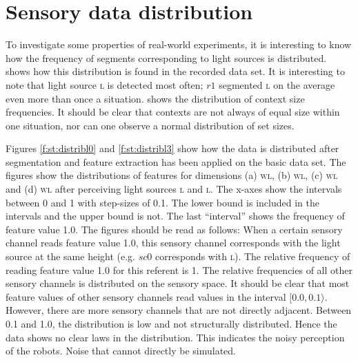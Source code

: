\chapter{Sensory data distribution}\label{a:dataset}

To investigate some properties of real-world experiments, it is interesting to know how the frequency of segments corresponding to light sources is distribut\-ed.  shows how this distribution is found in the recorded data set. It is interesting to note that light source \textsc{l} is detected most often; $r1$ segmented \textsc{l} on the average even more than once a situation.  shows the distribution of context size frequencies. It should be clear that contexts are not always of equal size within one situation, nor can one observe a normal distribution of set sizes.

Figures \ref{f:st:distribl0} and \ref{f:st:distribl3} show how the data is distributed after segmentation and feature extraction has been applied on the basic data set. The figures show the distributions of features for dimensions (a) \textsc{wl}, (b) \textsc{wl}, (c) \textsc{wl} and (d) \textsc{wl} after perceiving light sources \textsc{l} and \textsc{l}. The x-axes show the intervals between 0 and 1 with step-sizes of 0.1. The lower bound is included in the intervals and the upper bound is not. The last ``interval'' shows the frequency of feature value 1.0. The figures should be read as follows: When a certain sensory channel reads feature value 1.0, this sensory channel corresponds with the light source at the same height (e.g. $sc0$ corresponds with \textsc{l}). The relative frequency of reading feature value 1.0 for this referent is 1. The relative frequencies of all other sensory channels is distributed on the sensory space. It should be clear that most feature values of other sensory channels read values in the interval $[0.0,0.1\rangle$. 
However, there are more sensory channels that are not directly adjacent. Between 0.1 and 1.0, the distribution is low and not structurally distributed. Hence the data shows no clear laws in the distribution. This indicates the noisy perception of the robots. Noise that cannot directly be simulated.

